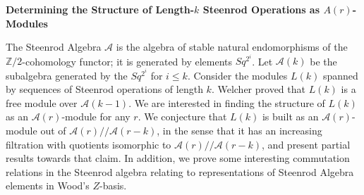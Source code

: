 \documentclass[11pt]{article}
\begin{document}
  \begin{center}
    \Large\bf\boldmath Determining the Structure of Length-$k$ Steenrod Operations as $A(r)$-Modules
  \end{center}

  The Steenrod Algebra $\mathcal{A}$ is the algebra of stable natural endomorphisms of the $\mathbb{Z}/2$-cohomology functor; it is generated by elements $Sq^{2^i}$.  Let $\mathcal{A}(k)$ be the subalgebra generated by the $Sq^{2^i}$ for $i\leq k$.  Consider the modules $L(k)$ spanned by sequences of Steenrod operations of length $k$.  Welcher proved that $L(k)$ is a free module over $\mathcal{A}(k-1)$.  We are interested in finding the structure of $L(k)$ as an $\mathcal{A}(r)$-module for any $r$.  We conjecture that $L(k)$ is built as an $\mathcal{A}(r)$-module out of $\mathcal{A}(r)/\!/\!\mathcal{A}(r-k)$, in the sense that it has an increasing filtration with quotients isomorphic to $\mathcal{A}(r)/\!/\!\mathcal{A}(r-k)$, and present partial results towards that claim.  In addition, we prove some interesting commutation relations in the Steenrod algebra relating to representations of Steenrod Algebra elements in Wood's $Z$-basis.
\end{document}
